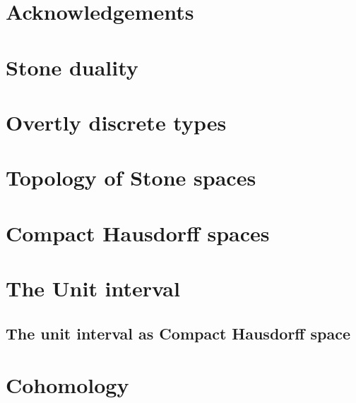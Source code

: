 \documentclass{../util/zariski}
\begin{document}
\section*{Acknowledgements}


\section{Stone duality}





\section{Overtly discrete types}


\section{Topology of Stone spaces}





\section{Compact Hausdorff spaces}




\section{The Unit interval}
\subsection{The unit interval as Compact Hausdorff space}




\section{Cohomology}






\appendix
\end{document}
